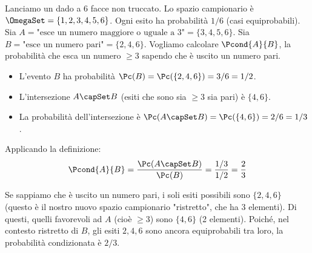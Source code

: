 \begin{example}
Lanciamo un dado a 6 facce non truccato.
Lo spazio campionario è $\OmegaSet = \{1, 2, 3, 4, 5, 6\}$. Ogni esito ha probabilità $1/6$ (casi equiprobabili).
Sia $A = \text{"esce un numero maggiore o uguale a 3"} = \{3, 4, 5, 6\}$.
Sia $B = \text{"esce un numero pari"} = \{2, 4, 6\}$.
Vogliamo calcolare $\Pcond{A}{B}$, la probabilità che esca un numero $\ge 3$ sapendo che è uscito un numero pari.

\begin{itemize}
    \item L'evento $B$ ha probabilità $\Pc(B) = \Pc(\{2, 4, 6\}) = 3/6 = 1/2$.
    \item L'intersezione $A \capSet B$ (esiti che sono sia $\ge 3$ sia pari) è $\{4, 6\}$.
    \item La probabilità dell'intersezione è $\Pc(A \capSet B) = \Pc(\{4, 6\}) = 2/6 = 1/3$.
\end{itemize}
Applicando la definizione:
\[ \Pcond{A}{B} = \frac{\Pc(A \capSet B)}{\Pc(B)} = \frac{1/3}{1/2} = \frac{2}{3} \]
\begin{remark}
Se sappiamo che è uscito un numero pari, i soli esiti possibili sono $\{2, 4, 6\}$ (questo è il nostro nuovo spazio campionario "ristretto", che ha 3 elementi). Di questi, quelli favorevoli ad $A$ (cioè $\ge 3$) sono $\{4, 6\}$ (2 elementi). Poiché, nel contesto ristretto di $B$, gli esiti $2, 4, 6$ sono ancora equiprobabili tra loro, la probabilità condizionata è $2/3$.
\end{remark}
\end{example}

